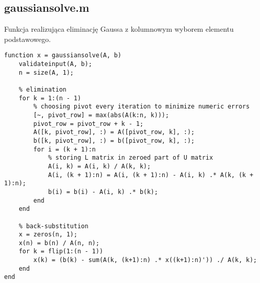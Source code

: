 \documentclass[12pt]{article}
\begin{document}
\subsection{gaussiansolve.m}
Funkcja realizująca eliminację Gaussa z kolumnowym wyborem elementu podstawowego.
\begin{verbatim}
function x = gaussiansolve(A, b)
    validateinput(A, b);
    n = size(A, 1);

    % elimination
    for k = 1:(n - 1)
        % choosing pivot every iteration to minimize numeric errors
        [~, pivot_row] = max(abs(A(k:n, k)));
        pivot_row = pivot_row + k - 1;
        A([k, pivot_row], :) = A([pivot_row, k], :);
        b([k, pivot_row], :) = b([pivot_row, k], :);
        for i = (k + 1):n
            % storing L matrix in zeroed part of U matrix
            A(i, k) = A(i, k) / A(k, k);
            A(i, (k + 1):n) = A(i, (k + 1):n) - A(i, k) .* A(k, (k + 1):n);
            b(i) = b(i) - A(i, k) .* b(k);
        end
    end

    % back-substitution
    x = zeros(n, 1);
    x(n) = b(n) / A(n, n);
    for k = flip(1:(n - 1))
        x(k) = (b(k) - sum(A(k, (k+1):n) .* x((k+1):n)')) ./ A(k, k);
    end
end
\end{verbatim}
\end{document}
